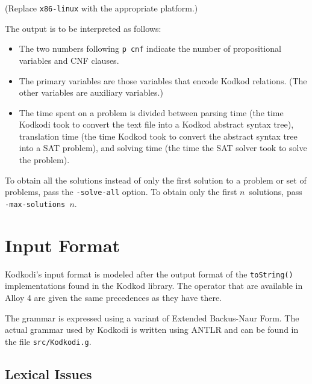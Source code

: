 \documentclass[a4paper,12pt]{article}
\begin{document}
    (Replace \texttt{x86-linux} with the appropriate platform.)

    The output is to be interpreted as follows:
%
    \begin{itemize}
        \item The two numbers following \texttt{p~cnf} indicate the number of
        propositional variables and CNF clauses.
        \item The primary variables are those variables that encode Kodkod relations.
        (The other variables are auxiliary variables.)
        \item The time spent on a problem is divided between parsing time (the time
        Kodkodi took to convert the text file into a Kodkod abstract syntax tree),
        translation time (the time Kodkod took to convert the abstract syntax tree into
        a SAT problem), and solving time (the time the SAT solver took to solve the
        problem).
    \end{itemize}
%
    To obtain all the solutions instead of only the first solution to a problem or
    set of problems, pass the \texttt{-solve-all} option. To obtain only the first
    $n$~solutions, pass \texttt{-max-solutions~$n$}.


    \section{Input Format}
    \label{input-format}

    Kodkodi's input format is modeled after the output format of the
    \texttt{toString()} implementations found in the Kodkod library. The operator
    that are available in Alloy 4 are given the same precedences as they have there.

    The grammar is expressed using a variant of Extended Backus-Naur Form. The
    actual grammar used by Kodkodi is written using ANTLR and can be found in the
    file \texttt{src/Kodkodi.g}.

    \subsection{Lexical Issues}
    \label{lexical-issues}
\end{document}
